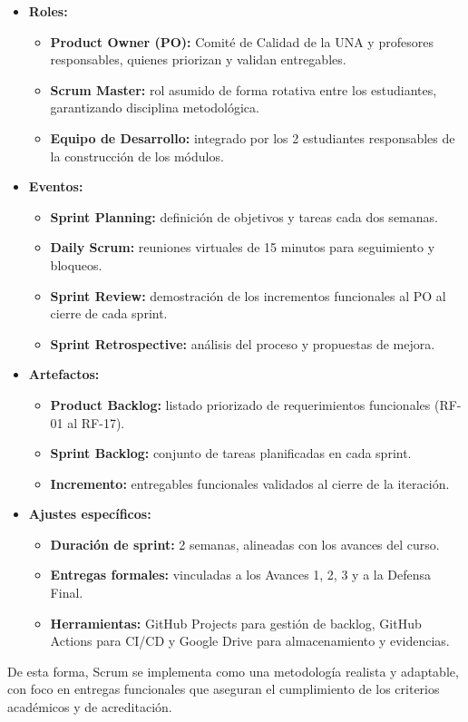 \begin{itemize}
    \item \textbf{Roles:}
    \begin{itemize}
        \item \textbf{Product Owner (PO):} Comité de Calidad de la UNA y profesores responsables, quienes priorizan y validan entregables.
        \item \textbf{Scrum Master:} rol asumido de forma rotativa entre los estudiantes, garantizando disciplina metodológica.
        \item \textbf{Equipo de Desarrollo:} integrado por los 2 estudiantes responsables de la construcción de los módulos.
    \end{itemize}

    \item \textbf{Eventos:}
    \begin{itemize}
        \item \textbf{Sprint Planning:} definición de objetivos y tareas cada dos semanas.
        \item \textbf{Daily Scrum:} reuniones virtuales de 15 minutos para seguimiento y bloqueos.
        \item \textbf{Sprint Review:} demostración de los incrementos funcionales al PO al cierre de cada sprint.
        \item \textbf{Sprint Retrospective:} análisis del proceso y propuestas de mejora.
    \end{itemize}

    \item \textbf{Artefactos:}
    \begin{itemize}
        \item \textbf{Product Backlog:} listado priorizado de requerimientos funcionales (RF-01 al RF-17).
        \item \textbf{Sprint Backlog:} conjunto de tareas planificadas en cada sprint.
        \item \textbf{Incremento:} entregables funcionales validados al cierre de la iteración.
    \end{itemize}

    \item \textbf{Ajustes específicos:}
    \begin{itemize}
        \item \textbf{Duración de sprint:} 2 semanas, alineadas con los avances del curso.
        \item \textbf{Entregas formales:} vinculadas a los Avances 1, 2, 3 y a la Defensa Final.
        \item \textbf{Herramientas:} GitHub Projects para gestión de backlog, GitHub Actions para CI/CD y Google Drive para almacenamiento y evidencias.
    \end{itemize}
\end{itemize}

De esta forma, Scrum se implementa como una metodología realista y adaptable, con foco en entregas funcionales que aseguran el cumplimiento de los criterios académicos y de acreditación.
